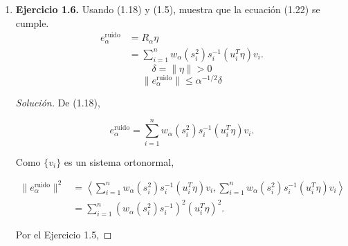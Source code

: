 \documentclass[12pt,spanish,mexico]{article}
\numberwithin{equation}{section}
\theoremstyle{definition}
\theoremstyle{remark}
\newenvironment{solution}{\begin{proof}[Solución]}{\end{proof}}
\begin{document}
\begin{enumerate}[label=(\alph*)]
\begin{enumerate}
\begin{solution}
\begin{align*}
            s &\leq \alpha^{-1/2}(s^2+\alpha) \\
            0 &\leq \alpha^{-1/2}(s^2+\alpha)-s\\
            0 &\leq \alpha^{-1/2}s^2-s+\alpha^{1/2}\\
            0 &\leq s^2-\alpha^{1/2}s+\alpha\\
            0 &\leq s^2-\alpha^{1/2}s+\alpha+\frac{\alpha}{4}-\frac{\alpha}{4}\\
            0 &\leq \left(s^2-\frac{\alpha^{1/2}}{2}\right)^2+\frac{3 \alpha}{4}
            \end{align*}
            la última desigualdad es verdadera para todo $s$  por lo tanto cumple la desigualdad (1.21).
        \end{solution}
        \item \textbf{Ejercicio 1.6.} Usando (1.18) y (1.5), muestra que la ecuación (1.22) se cumple.
        \begin{equation}
            \begin{aligned}
                e_\alpha^{\text{ruido}} &= R_\alpha \eta\\
                &=\sum_{i=1}^{n}w_\alpha(s_i^2)s_i^{-1}(u_i^T \eta)v_i.
            \end{aligned}
            \tag{1.18}
        \end{equation}
        \begin{equation}
            \delta = \|\eta\|>0
            \tag{1.5}
        \end{equation}
        \begin{equation}
            \|e_\alpha^{\text{ruido}}\| \leq \alpha^{-1/2} \delta
            \tag{1.22}
        \end{equation}
        \begin{solution}
        De (1.18),

\[
e_\alpha^{\text{ruido}}
=
\sum_{i=1}^{n}
w_\alpha(s_i^2)s_i^{-1}(u_i^T \eta)v_i.
\]

Como $\{v_i\}$ es un sistema ortonormal,

\begin{align*}
\|e_\alpha^{\text{ruido}}\|^2
&=\left\langle \sum_{i=1}^{n}
w_\alpha(s_i^2)s_i^{-1}(u_i^T \eta)v_i,\sum_{i=1}^{n}
w_\alpha(s_i^2)s_i^{-1}(u_i^T \eta)v_i \right\rangle\\
&=\sum_{i=1}^{n}\left(w_\alpha(s_i^2)s_i^{-1}\right)^2 (u_i^T \eta)^2.
\end{align*}

Por el Ejercicio 1.5,


\end{solution}
\end{enumerate}
\end{enumerate}
\end{document}
